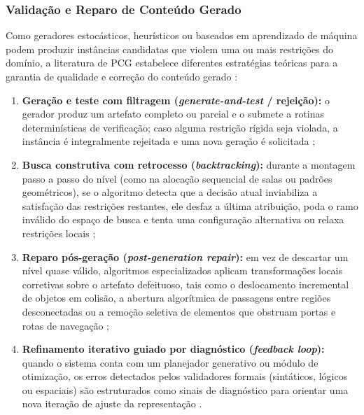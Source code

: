 \subsubsection{Validação e Reparo de Conteúdo Gerado}
\label{sec:validacao_reparo}

Como geradores estocásticos, heurísticos ou baseados em aprendizado de máquina podem produzir instâncias candidatas que violem uma ou mais restrições do domínio, a literatura de PCG estabelece diferentes estratégias teóricas para a garantia de qualidade e correção do conteúdo gerado \cite{pcgbook, summerville2018procedural, maleki2024procedural, xu2025databasedrivenframework3dlevel}:
\begin{enumerate}
    \item \textbf{Geração e teste com filtragem (\textit{generate-and-test} / rejeição):} o gerador produz um artefato completo ou parcial e o submete a rotinas determinísticas de verificação; caso alguma restrição rígida seja violada, a instância é integralmente rejeitada e uma nova geração é solicitada \cite{pcgbook, maleki2024procedural};
    \item \textbf{Busca construtiva com retrocesso (\textit{backtracking}):} durante a montagem passo a passo do nível (como na alocação sequencial de salas ou padrões geométricos), se o algoritmo detecta que a decisão atual inviabiliza a satisfação das restrições restantes, ele desfaz a última atribuição, poda o ramo inválido do espaço de busca e tenta uma configuração alternativa ou relaxa restrições locais \cite{tanagra, linden2014dungeons};
    \item \textbf{Reparo pós-geração (\textit{post-generation repair}):} em vez de descartar um nível quase válido, algoritmos especializados aplicam transformações locais corretivas sobre o artefato defeituoso, tais como o deslocamento incremental de objetos em colisão, a abertura algorítmica de passagens entre regiões desconectadas ou a remoção seletiva de elementos que obstruam portas e rotas de navegação \cite{summerville2018procedural, sun2024roomplanner, xu2025databasedrivenframework3dlevel};
    \item \textbf{Refinamento iterativo guiado por diagnóstico (\textit{feedback loop}):} quando o sistema conta com um planejador generativo ou módulo de otimização, os erros detectados pelos validadores formais (sintáticos, lógicos ou espaciais) são estruturados como sinais de diagnóstico para orientar uma nova iteração de ajuste da representação \cite{hu2024scenecraft, nasir2024word2worldgeneratingstoriesworlds, xu2025constraint, her2025zeroshot3dmapgeneration}.
\end{enumerate}

